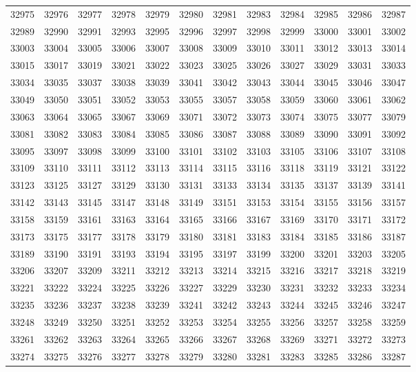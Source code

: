 \begin{center}
\begin{longtable}{llllllllllll}
32975 &32976 &32977 &32978 &32979 &32980 &32981 &32983 &32984 &32985 &32986 &32987 \\
32989 &32990 &32991 &32993 &32995 &32996 &32997 &32998 &32999 &33000 &33001 &33002 \\
33003 &33004 &33005 &33006 &33007 &33008 &33009 &33010 &33011 &33012 &33013 &33014 \\
33015 &33017 &33019 &33021 &33022 &33023 &33025 &33026 &33027 &33029 &33031 &33033 \\
33034 &33035 &33037 &33038 &33039 &33041 &33042 &33043 &33044 &33045 &33046 &33047 \\
33049 &33050 &33051 &33052 &33053 &33055 &33057 &33058 &33059 &33060 &33061 &33062 \\
33063 &33064 &33065 &33067 &33069 &33071 &33072 &33073 &33074 &33075 &33077 &33079 \\
33081 &33082 &33083 &33084 &33085 &33086 &33087 &33088 &33089 &33090 &33091 &33092 \\
33095 &33097 &33098 &33099 &33100 &33101 &33102 &33103 &33105 &33106 &33107 &33108 \\
33109 &33110 &33111 &33112 &33113 &33114 &33115 &33116 &33118 &33119 &33121 &33122 \\
33123 &33125 &33127 &33129 &33130 &33131 &33133 &33134 &33135 &33137 &33139 &33141 \\
33142 &33143 &33145 &33147 &33148 &33149 &33151 &33153 &33154 &33155 &33156 &33157 \\
33158 &33159 &33161 &33163 &33164 &33165 &33166 &33167 &33169 &33170 &33171 &33172 \\
33173 &33175 &33177 &33178 &33179 &33180 &33181 &33183 &33184 &33185 &33186 &33187 \\
33189 &33190 &33191 &33193 &33194 &33195 &33197 &33199 &33200 &33201 &33203 &33205 \\
33206 &33207 &33209 &33211 &33212 &33213 &33214 &33215 &33216 &33217 &33218 &33219 \\
33221 &33222 &33224 &33225 &33226 &33227 &33229 &33230 &33231 &33232 &33233 &33234 \\
33235 &33236 &33237 &33238 &33239 &33241 &33242 &33243 &33244 &33245 &33246 &33247 \\
33248 &33249 &33250 &33251 &33252 &33253 &33254 &33255 &33256 &33257 &33258 &33259 \\
33261 &33262 &33263 &33264 &33265 &33266 &33267 &33268 &33269 &33271 &33272 &33273 \\
33274 &33275 &33276 &33277 &33278 &33279 &33280 &33281 &33283 &33285 &33286 &33287 \\

\end{longtable}
\end{center}
